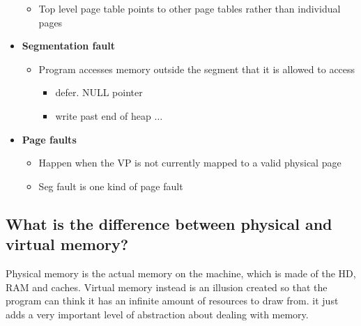 \documentclass[a4paper]{article}
\begin{document}
\begin{itemize}
\begin{itemize}
      \item Top level page table points to other page tables rather than individual pages
    \end{itemize}
  \item {\bf Segmentation fault }
    \begin{itemize}
      \item Program accesses memory outside the segment that it is allowed to access
        \begin{itemize}
          \item defer. NULL pointer
          \item write past end of heap $\dots$
        \end{itemize}
    \end{itemize}
  \item {\bf Page faults}
    \begin{itemize}
      \item Happen when the VP is not currently mapped to a valid physical page
      \item Seg fault is one kind of page fault
    \end{itemize}
\end{itemize}
\subsection{What is the difference between physical and virtual memory?} %
\label{sub:What is the difference between physical and virtual memory?}
Physical memory is the actual memory on the machine, which is made of the HD, RAM and caches. Virtual memory instead
is an illusion created so that the program can think it has an infinite amount of resources to draw from. it just adds a very important level of abstraction about dealing with memory.
\end{document}

